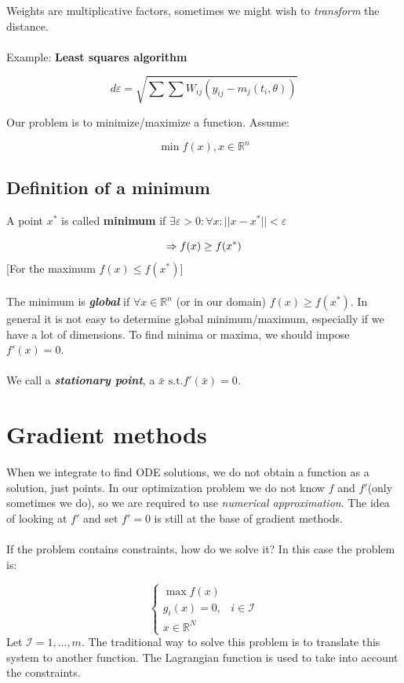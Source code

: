 \noindent
Weights are multiplicative factors, sometimes we might wish to
\emph{transform} the distance. 
\\
\\
\noindent
Example:  \textbf{Least squares algorithm}

$$d{\varepsilon}=\sqrt{\sum \sum W_{ij}\left(y_{ij}-m_j\left(t_i, \theta\right)\right)}$$

\noindent
Our problem is to minimize/maximize a function. Assume:

$$
\min f(x), x \in \mathbb{R}^n
$$

\subsection{Definition of a minimum}

A point $x^*$ is called \textbf{minimum} if
$\exists \varepsilon > 0 : \forall x : || x- x^* || < \varepsilon$

$$
\Rightarrow f(x) \geq f(x^*) \\ 
$$
\noindent
{[}For the maximum $f(x) \leq f(x^*)${]}
\\
\\
\noindent
The minimum is \textbf{\emph{global}} if $\forall x \in \mathbb{R}^n$
(or in our domain) $f(x) \geq f(x^*)$. In general it is not easy to
determine global minimum/maximum, especially if we have a lot of
dimensions.
\noindent
To find minima or maxima, we should impose $f'(x)=0$.
\\
\\
\noindent
We call a \textbf{\emph{stationary point}}, a
$\bar{x} \text{ s.t.} f'(\bar{x})=0$.


\section{Gradient methods}

When we integrate to find ODE solutions, we do not obtain a function as
a solution, just points. In our optimization problem we do not know $f$ and $f'$(only sometimes
we do), so we are required to use \emph{numerical approximation}. The idea of
looking at $f'$ and set $f'=0$ is still at the base of gradient methods.
\\
\\
\noindent
If the problem contains constraints, how do we solve it? In this case
the problem is:

$$\left\{\begin{array}{ll}
\max f(x) &  \\
g_i(x)=0, & i \in \mathcal{I} \\
x \in \mathbb{R}^N
\end{array}\right.$$
\noindent
Let $\mathcal{I}= 1,...,m$. The traditional way to solve this problem is
to translate this system to another function. The Lagrangian function is
used to take into account the constraints.


